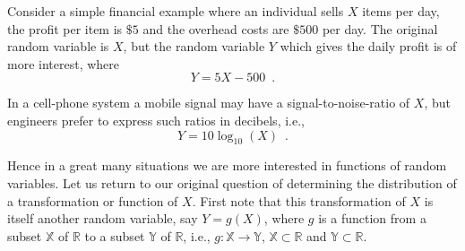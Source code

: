 \begin{example}
Consider a simple financial example where an individual sells $X$ items per day, the profit per item is $\$ 5$ and the overhead costs are $\$ 500$ per day.  The original random variable is $X$, but the random variable $Y$ which gives the daily profit is of more interest, where
\[
Y = 5X - 500 \enspace . 
\]
\end{example}

\begin{example}
In a cell-phone system a mobile signal may have a signal-to-noise-ratio of $X$, but engineers prefer to express such ratios in decibels, i.e.,
\[
Y = 10 \log_{10}(X) \enspace .
\]
\end{example}

Hence in a great many situations we are more interested in functions of random variables. 
Let us return to our original question of determining the distribution of a transformation or function of $X$.  
First note that this transformation of $X$ is itself another random variable, say $Y = g(X)$, 
where $g$ is a function from a subset $\mathbb{X}$ of $\mathbb{R}$ to a subset $\mathbb{Y}$ of $\mathbb{R}$, 
i.e., $g: \mathbb{X} \to \mathbb{Y}$, $\mathbb{X} \subset \mathbb{R}$ and $\mathbb{Y} \subset \mathbb{R}$.

